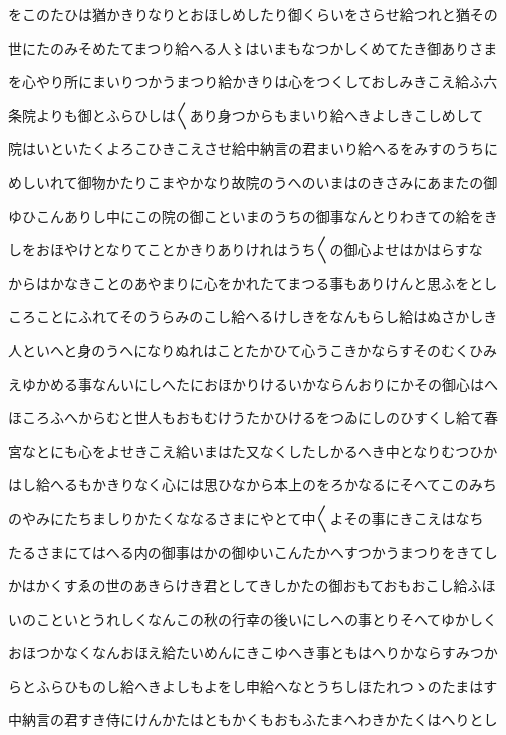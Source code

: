 \documentclass[a4paper,11pt,landscape]{ltjtarticle}
\begin{document}
をこのたひは猶かきりなりとおほしめしたり御くらいをさらせ給つれと猶その
\par\medskip
世にたのみそめたてまつり給へる人〻はいまもなつかしくめてたき御ありさま
\par\medskip
を心やり所にまいりつかうまつり給かきりは心をつくしておしみきこえ給ふ六
\par\medskip
条院よりも御とふらひしは〱あり身つからもまいり給へきよしきこしめして
\par\medskip
院はいといたくよろこひきこえさせ給中納言の君まいり給へるをみすのうちに
\par\medskip
めしいれて御物かたりこまやかなり故院のうへのいまはのきさみにあまたの御
\par\medskip
ゆひこんありし中にこの院の御こといまのうちの御事なんとりわきての給をき
\par\medskip
しをおほやけとなりてことかきりありけれはうち〱の御心よせはかはらすな
\par\medskip
からはかなきことのあやまりに心をかれたてまつる事もありけんと思ふをとし
\par\medskip
ころことにふれてそのうらみのこし給へるけしきをなんもらし給はぬさかしき
\par\medskip
人といへと身のうへになりぬれはことたかひて心うこきかならすそのむくひみ
\par\medskip
えゆかめる事なんいにしへたにおほかりけるいかならんおりにかその御心はへ
\par\medskip
ほころふへからむと世人もおもむけうたかひけるをつゐにしのひすくし給て春
\par\medskip
宮なとにも心をよせきこえ給いまはた又なくしたしかるへき中となりむつひか
\par\medskip
はし給へるもかきりなく心には思ひなから本上のをろかなるにそへてこのみち
\par\medskip
のやみにたちましりかたくななるさまにやとて中〱よその事にきこえはなち
\par\medskip
たるさまにてはへる内の御事はかの御ゆいこんたかへすつかうまつりをきてし
\par\medskip
かはかくすゑの世のあきらけき君としてきしかたの御おもておもおこし給ふほ
\par\medskip
いのこといとうれしくなんこの秋の行幸の後いにしへの事とりそへてゆかしく
\par\medskip
おほつかなくなんおほえ給たいめんにきこゆへき事ともはへりかならすみつか
\par\medskip
らとふらひものし給へきよしもよをし申給へなとうちしほたれつゝのたまはす
\par\medskip
中納言の君すき侍にけんかたはともかくもおもふたまへわきかたくはへりとし
\end{document}
